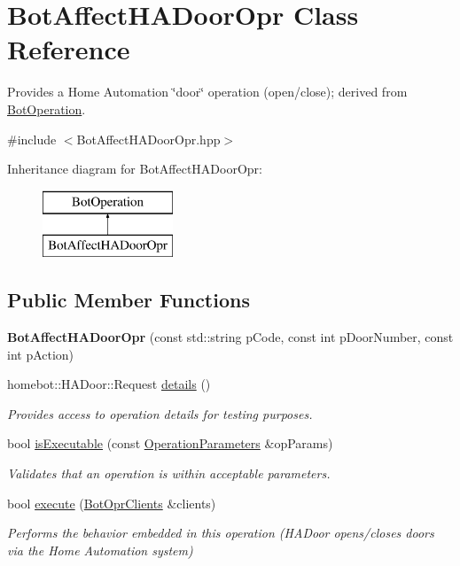 \hypertarget{classBotAffectHADoorOpr}{\section{Bot\-Affect\-H\-A\-Door\-Opr Class Reference}
\label{classBotAffectHADoorOpr}
}


Provides a Home Automation \char`\"{}door\char`\"{} operation (open/close); derived from \hyperlink{classBotOperation}{Bot\-Operation}.  




{\ttfamily \#include $<$Bot\-Affect\-H\-A\-Door\-Opr.\-hpp$>$}

Inheritance diagram for Bot\-Affect\-H\-A\-Door\-Opr\-:\begin{figure}[H]
\begin{center}
\leavevmode
\includegraphics[height=2.000000cm]{classBotAffectHADoorOpr}
\end{center}
\end{figure}
\subsection*{Public Member Functions}
\begin{DoxyCompactItemize}
\item 
\hypertarget{classBotAffectHADoorOpr_aaf986c676dad29e1c151df36e42f3fc3}{{\bfseries Bot\-Affect\-H\-A\-Door\-Opr} (const std\-::string p\-Code, const int p\-Door\-Number, const int p\-Action)}\label{classBotAffectHADoorOpr_aaf986c676dad29e1c151df36e42f3fc3}

\item 
homebot\-::\-H\-A\-Door\-::\-Request \hyperlink{classBotAffectHADoorOpr_a25eed68370708f33963cb962b8e23580}{details} ()
\begin{DoxyCompactList}\small\item\em Provides access to operation details for testing purposes. \end{DoxyCompactList}\item 
bool \hyperlink{classBotAffectHADoorOpr_a6a82af8cbb0f8c48abbc04dc3f63811b}{is\-Executable} (const \hyperlink{classOperationParameters}{Operation\-Parameters} \&op\-Params)
\begin{DoxyCompactList}\small\item\em Validates that an operation is within acceptable parameters. \end{DoxyCompactList}\item 
bool \hyperlink{classBotAffectHADoorOpr_ae6ea9d64ffdb7f2c5622500109a545b7}{execute} (\hyperlink{classBotOprClients}{Bot\-Opr\-Clients} \&clients)
\begin{DoxyCompactList}\small\item\em Performs the behavior embedded in this operation (H\-A\-Door opens/closes doors via the Home Automation system) \end{DoxyCompactList}\end{DoxyCompactItemize}
